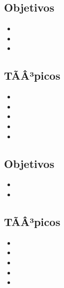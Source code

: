\subsection*{Objetivos}
\begin{itemize}
	\item \OSDIEZObjUNO
	\item \OSDIEZObjDOS
	\item \OSDIEZObjTRES
\end{itemize}

\subsection{\OSONCEDef}\label{sec:BOK-OS11}

\subsection*{TÃÂ³picos}
\begin{itemize}
	\item \OSONCETopicPor
	\item \OSONCETopicQue
	\item \OSONCETopicPoliticas
	\item \OSONCETopicModelos
	\item \OSONCETopicComo
\end{itemize}

\subsection*{Objetivos}
\begin{itemize}
	\item \OSONCEObjUNO
	\item \OSONCEObjDOS
\end{itemize}

\subsection{\OSDOCEDef}\label{sec:BOK-OS12}

\subsection*{TÃÂ³picos}
\begin{itemize}
	\item \OSDOCETopicScripting
	\item \OSDOCETopicComandos
	\item \OSDOCETopicCreacion
	\item \OSDOCETopicEjecucion
	\item \OSDOCETopicInfluencias
\end{itemize}

